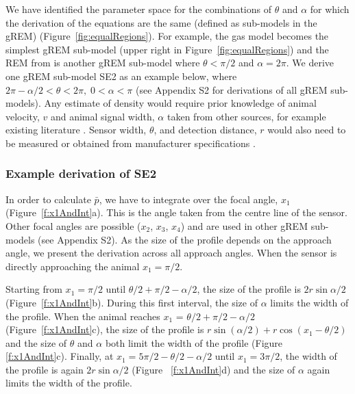 We have identified the parameter space for the combinations of $\theta$ and $\alpha$ for which the derivation of the equations are the same (defined as sub-models in the gREM) (Figure~\ref{fig:equalRegions}).
For example, the gas model becomes the simplest gREM sub-model (upper right in Figure~\ref{fig:equalRegions}) and the REM from \cite{rowcliffe2008estimating} is another gREM sub-model where $\theta<\pi/2$ and $\alpha = 2\pi$.
We derive one gREM sub-model SE2 as an example below, where $2 \pi - \alpha/2 < \theta < 2\pi ,\; 0 < \alpha <\pi$ (see Appendix S2 for derivations of all gREM sub-models).
Any estimate of density would require prior knowledge of animal velocity, $v$ and animal signal width, $\alpha$ taken from other sources, for example existing literature \cite{brinklov2011, carbone2005far}.
Sensor width, $\theta$, and detection distance, $r$ would also need to be measured or obtained from manufacturer specifications \cite{holderied2003echolocation, adams2012you}.


\subsubsection{Example derivation of SE2}

In order to calculate $\bar{p}$, we have to integrate over the focal angle, $x_1$ (Figure~\ref{f:x1AndInt}a).
This is the angle taken from the centre line of the sensor.
Other focal angles are possible ($x_2$, $x_3$, $x_4$) and are used in other gREM sub-models (see Appendix S2).
As the size of the profile depends on the approach angle, we present the derivation across all approach angles.
When the sensor is directly approaching the animal $x_1  = \pi/2$.

Starting from $x_1 = \pi/2$ until $\theta/2 + \pi/2 - \alpha/2$, the size of the profile is $2r\sin \alpha/2$ (Figure~\ref{f:x1AndInt}b).
During this first interval, the size of $\alpha$ limits the width of the profile.
When the animal reaches $x_1$  = $\theta/2 + \pi/2 - \alpha/2$ (Figure~\ref{f:x1AndInt}c), the size of the profile is $r\sin( \alpha/2) + r\cos( x_1  - \theta/2)$ and the size of $\theta$ and $\alpha$ both limit the width of the profile (Figure~ \ref{f:x1AndInt}c).
Finally, at $x_1  = 5\pi/2 - \theta/2  - \alpha/2$ until $x_1  = 3\pi/2$, the width of the profile is again $2r\sin\alpha/2$ (Figure~ \ref{f:x1AndInt}d) and the size of $\alpha$ again limits the width of the profile. 


